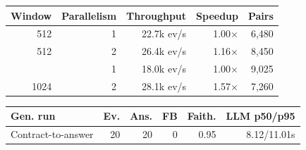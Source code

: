 \begingroup
\scriptsize
\setlength{\tabcolsep}{2.6pt}
\begin{minipage}{\columnwidth}
\centering
\begin{tabular}{@{}rrrrr@{}}
  \toprule
  Window & Parallelism & Throughput & Speedup & Pairs \\
  \midrule
  512 & 1 & 22.7k ev/s & 1.00$\times$ & 6,480 \\
  512 & 2 & 26.4k ev/s & 1.16$\times$ & 8,450 \\
  \addlinespace[2pt]
  1024 & 1 & 18.0k ev/s & 1.00$\times$ & 9,025 \\
  1024 & 2 & 28.1k ev/s & 1.57$\times$ & 7,260 \\
  \bottomrule
\end{tabular}

\vspace{3pt}
\begin{tabular}{@{}lrrrrr@{}}
  \toprule
  Gen. run & Ev. & Ans. & FB & Faith. & LLM p50/p95 \\
  \midrule
  Contract-to-answer & 20 & 20 & 0 & 0.95 & 8.12/11.01s \\
  \bottomrule
\end{tabular}
\end{minipage}
\endgroup
